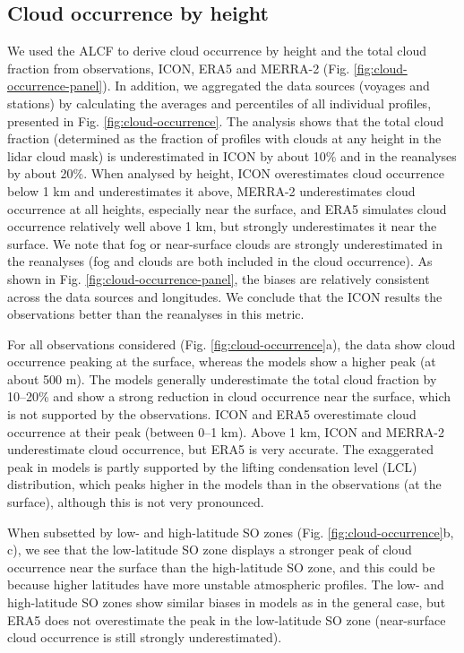 \documentclass[12pt,a4paper]{article}
\begin{document}
\subsection{Cloud occurrence by height}
\label{sec:cloud-occurrence}

We used the ALCF to derive cloud occurrence by height and the total cloud
fraction from observations, ICON, ERA5 and MERRA-2 (Fig.
\ref{fig:cloud-occurrence-panel}). In addition, we aggregated the data sources
(voyages and stations) by calculating the averages and percentiles of all
individual profiles, presented in Fig. \ref{fig:cloud-occurrence}. The analysis
shows that the total cloud fraction (determined as the fraction of profiles
with clouds at any height in the lidar cloud mask) is underestimated in ICON
by about 10\% and in the reanalyses by about 20\%. When analysed by
height, ICON overestimates cloud occurrence below 1 km and underestimates it
above, MERRA-2 underestimates cloud occurrence at all heights, especially near
the surface, and ERA5 simulates cloud occurrence relatively well above 1 km,
but strongly underestimates it near the surface.  We note that fog or
near-surface clouds are strongly underestimated in the reanalyses (fog and clouds are
both included in the cloud occurrence).  As shown in Fig.
\ref{fig:cloud-occurrence-panel}, the biases are relatively consistent across
the data sources and longitudes. We conclude that the ICON results  the observations better than the reanalyses in this metric.

For all observations considered (Fig. \ref{fig:cloud-occurrence}a), the data show
cloud occurrence peaking at the surface, whereas the models show a higher peak (at
about 500 m). The models generally underestimate the total cloud fraction by 10--20\% and show a strong reduction in cloud occurrence near the surface, which is not
supported by the observations. ICON and ERA5 overestimate cloud occurrence at
their peak (between 0--1 km). Above 1 km, ICON and MERRA-2 underestimate cloud
occurrence, but ERA5 is very accurate. The exaggerated peak in models is partly
supported by the lifting condensation level (LCL) distribution, which peaks
higher in the models than in the observations (at the surface), although this
is not very pronounced.

When subsetted by low- and high-latitude SO zones (Fig.
\ref{fig:cloud-occurrence}b, c), we see that the low-latitude SO zone displays
a stronger peak of cloud occurrence near the surface than the high-latitude SO
zone, and this could be because higher latitudes have more unstable atmospheric
profiles. The low- and high-latitude SO zones show similar biases in models as
in the general case, but ERA5 does not overestimate the peak in the
low-latitude SO zone (near-surface cloud occurrence is still strongly
underestimated).
\end{document}
